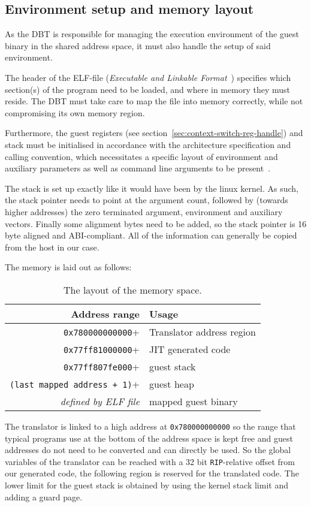 \subsection{Environment setup and memory layout}
\label{sec:memory-layout}
As the DBT is responsible for managing the execution environment of the guest binary in the shared address space, it must also handle the setup of said environment.

The header of the ELF-file (\textit{Executable and Linkable Format}~\cite{elf}) specifies which section(s) of the program need to be loaded, and where in memory they must reside.
The DBT must take care to map the file into memory correctly, while not compromising its own memory region.

Furthermore, the guest registers (see section~\ref{sec:context-switch-reg-handle}) and stack must be initialised in accordance with the architecture specification and calling convention, which necessitates a specific layout of environment and auxiliary parameters as well as command line arguments to be present~\cite[S. 2]{bintrans}.

The stack is set up exactly like it would have been by the linux kernel.
As such, the stack pointer needs to point at the argument count, followed by (towards higher addresses) the zero terminated argument, environment and auxiliary vectors.
Finally some alignment bytes need to be added, so the stack pointer is 16 byte aligned and ABI-compliant.
All of the information can generally be copied from the host in our case.

The memory is laid out as follows:
\begin{table}[h]
	\centering
	\begin{tabular}{rl}
		\toprule
		\textbf{Address range} & \textbf{Usage}\\
		\midrule
		\texttt{0x780000000000}+ & Translator address region\\
		\texttt{0x77ff81000000}+ & JIT generated code\\
		\texttt{0x77ff807fe000}+ & guest stack\\
		\texttt{(last mapped address + 1)}+ & guest heap\\
		\textit{defined by ELF file} & mapped guest binary\\
		\bottomrule
	\end{tabular}
	\caption[Memory layout]%
	{The layout of the memory space.}
	\label{tab:memory-layout}
\end{table}
The translator is linked to a high address at \texttt{0x780000000000} so the range that typical programs use at the bottom of the address space is kept free and guest addresses do not need to be converted and can directly be used.
So the global variables of the translator can be reached with a 32 bit \texttt{RIP}-relative offset from our generated code, the following region is reserved for the translated code.
The lower limit for the guest stack is obtained by using the kernel stack limit and adding a guard page.


